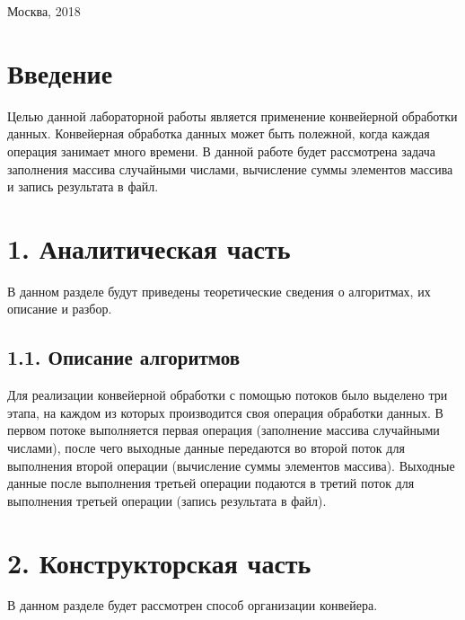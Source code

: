 \documentclass[a4paper,12pt]{article}
\begin{document}
\begin{center}
    {\Large Москва, 2018}
\end{center}

\newpage

\tableofcontents

\newpage
\section*{Введение}

Целью данной лабораторной работы является применение конвейерной обработки данных. Конвейерная обработка данных может быть полежной, когда каждая операция занимает много времени. В данной работе будет рассмотрена задача заполнения массива случайными числами, вычисление суммы элементов массива и запись результата в файл.
\newpage
\section*{1. Аналитическая часть}

В данном разделе будут приведены теоретические сведения о алгоритмах, их описание и разбор.

\subsection*{1.1. Описание алгоритмов}

Для реализации конвейерной обработки с помощью потоков было выделено три этапа, на каждом из которых производится своя операция обработки данных. В первом потоке выполняется первая операция (заполнение массива случайными числами), после чего выходные данные передаются во второй поток для выполнения второй операции (вычисление суммы элементов массива). Выходные данные после выполнения третьей операции подаются в третий поток для выполнения третьей операции (запись результата в файл).\\


\newpage
\section*{2. Конструкторская часть}
В данном разделе будет рассмотрен способ организации конвейера.
\end{document}

